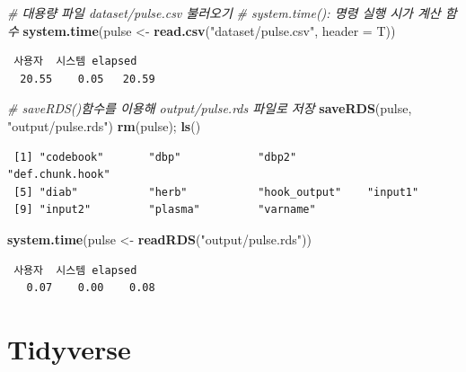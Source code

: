 \documentclass[
  11pt,
]{krantz}
\newenvironment{Shaded}{\begin{snugshade}}{\end{snugshade}}
\newcommand{\CommentTok}[1]{\textcolor[rgb]{0.37,0.37,0.37}{\textit{#1}}}
\newcommand{\DataTypeTok}[1]{\textcolor[rgb]{0.27,0.27,0.27}{#1}}
\newcommand{\KeywordTok}[1]{\textcolor[rgb]{0.27,0.27,0.27}{\textbf{#1}}}
\newcommand{\NormalTok}[1]{#1}
\newcommand{\StringTok}[1]{\textcolor[rgb]{0.5,0.5,0.5}{#1}}
\begin{document}
\footnotesize

\begin{Shaded}
\begin{Highlighting}[]
\CommentTok{# 대용량 파일 dataset/pulse.csv 불러오기}
\CommentTok{# system.time(): 명령 실행 시가 계산 함수}
\KeywordTok{system.time}\NormalTok{(pulse <-}\StringTok{ }\KeywordTok{read.csv}\NormalTok{(}\StringTok{"dataset/pulse.csv"}\NormalTok{, }\DataTypeTok{header =}\NormalTok{ T))}
\end{Highlighting}
\end{Shaded}

\begin{verbatim}
 사용자  시스템 elapsed 
  20.55    0.05   20.59 
\end{verbatim}

\begin{Shaded}
\begin{Highlighting}[]
\CommentTok{# saveRDS()함수를 이용해 output/pulse.rds 파일로 저장}
\KeywordTok{saveRDS}\NormalTok{(pulse, }\StringTok{"output/pulse.rds"}\NormalTok{)}
\KeywordTok{rm}\NormalTok{(pulse); }\KeywordTok{ls}\NormalTok{()}
\end{Highlighting}
\end{Shaded}

\begin{verbatim}
 [1] "codebook"       "dbp"            "dbp2"           "def.chunk.hook"
 [5] "diab"           "herb"           "hook_output"    "input1"        
 [9] "input2"         "plasma"         "varname"       
\end{verbatim}

\begin{Shaded}
\begin{Highlighting}[]
\KeywordTok{system.time}\NormalTok{(pulse <-}\StringTok{ }\KeywordTok{readRDS}\NormalTok{(}\StringTok{"output/pulse.rds"}\NormalTok{))}
\end{Highlighting}
\end{Shaded}

\begin{verbatim}
 사용자  시스템 elapsed 
   0.07    0.00    0.08 
\end{verbatim}

\normalsize

\hypertarget{tidyverse}{%
\section{Tidyverse}\label{tidyverse}}
\end{document}
